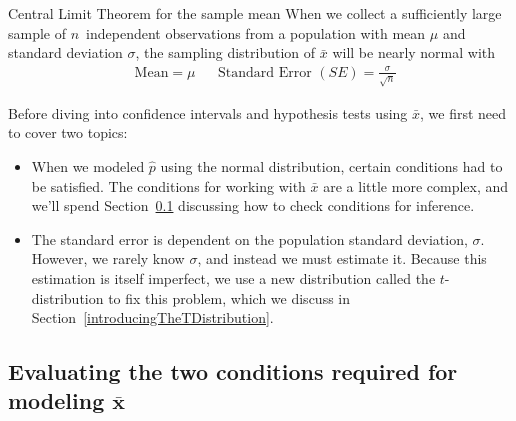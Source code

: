 \begin{onebox}{Central Limit Theorem for the sample mean}
  When we collect a sufficiently large sample of
  $n$~independent observations from a population with
  mean $\mu$ and standard deviation $\sigma$,
  the sampling distribution of $\bar{x}$ will be nearly
  normal with
  \begin{align*}
  &\text{Mean}=\mu
  &&\text{Standard Error }(SE) = \frac{\sigma}{\sqrt{n}}
  \end{align*}
\end{onebox}

\noindent%
Before diving into confidence intervals and hypothesis
tests using $\bar{x}$, we first need to cover two topics:
\begin{itemize}
\item
    When we modeled $\hat{p}$ using the normal distribution,
    certain conditions had to be satisfied.
    The conditions for working with $\bar{x}$
    are a little more complex, and we'll spend
    Section~\ref{x_bar_conditions} discussing
    how to check conditions for inference.
\item
    The standard error is dependent on the population
    standard deviation, $\sigma$.
    However, we rarely know $\sigma$, and instead
    we must estimate it.
    Because this estimation is itself imperfect,
    we use a new distribution called the
    $t$-distribution
    to fix this problem, which we discuss in
    Section~\ref{introducingTheTDistribution}.
\end{itemize}


\subsection[Evaluating the two conditions required for
    modeling $\bar{x}$]
  {Evaluating the two conditions required for
      modeling $\pmb{\bar{x}}$}
\label{x_bar_conditions}

